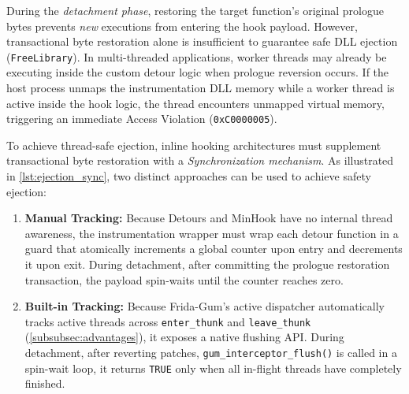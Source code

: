During the \emph{detachment phase}, restoring the target function's original prologue bytes prevents \emph{new} executions from entering the hook payload. However, transactional byte restoration alone is insufficient to guarantee safe \ac{DLL} ejection (\texttt{FreeLibrary}). In multi-threaded applications, worker threads may already be executing inside the custom detour logic when prologue reversion occurs. If the host process unmaps the instrumentation \ac{DLL} memory while a worker thread is active inside the hook logic, the thread encounters unmapped virtual memory, triggering an immediate Access Violation (\texttt{0xC0000005}).

To achieve thread-safe ejection, inline hooking architectures must supplement transactional byte restoration with a \emph{Synchronization mechanism}. As illustrated in \cref{lst:ejection_sync}, two distinct approaches can be used to achieve safety ejection:
\begin{enumerate}
	\item \textbf{Manual Tracking:} Because Detours and MinHook have no internal thread awareness, the instrumentation wrapper must wrap each detour function in a guard that atomically increments a global counter upon entry and decrements it upon exit. During detachment, after committing the prologue restoration transaction, the payload spin-waits until the counter reaches zero.
	\item \textbf{Built-in Tracking:} Because Frida-Gum's active dispatcher automatically tracks active threads across \texttt{enter\_thunk} and \texttt{leave\_thunk} (\cref{subsubsec:advantages}), it exposes a native flushing API. During detachment, after reverting patches, \texttt{gum\_interceptor\_flush()} is called in a spin-wait loop, it returns \texttt{TRUE} only when all in-flight threads have completely finished.
\end{enumerate}

